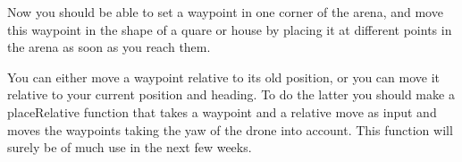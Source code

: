 \documentclass{article}
\begin{document}
Now you should be able to set a waypoint in one corner of the arena, and move this waypoint in the shape of a quare or house by placing it at different points in the arena as soon as you reach them. 

You can either move a waypoint relative to its old position, or you can move it relative to your current position and heading. To do the latter you should make a placeRelative function that takes a waypoint and a relative move as input and moves the waypoints taking the yaw of the drone into account. This function will surely be of much use in the next few weeks. 
\end{document}
